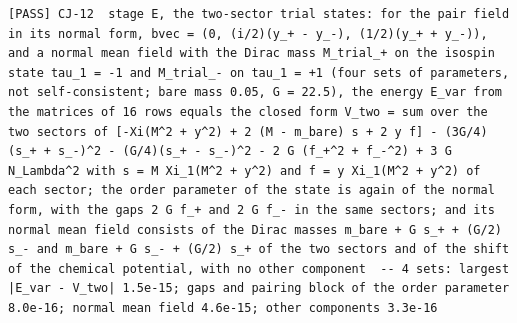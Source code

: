\documentclass[
  10pt,
]{article}
\begin{document}
\begin{verbatim}
[PASS] CJ-12  stage E, the two-sector trial states: for the pair field in its normal form, bvec = (0, (i/2)(y_+ - y_-), (1/2)(y_+ + y_-)), and a normal mean field with the Dirac mass M_trial_+ on the isospin state tau_1 = -1 and M_trial_- on tau_1 = +1 (four sets of parameters, not self-consistent; bare mass 0.05, G = 22.5), the energy E_var from the matrices of 16 rows equals the closed form V_two = sum over the two sectors of [-Xi(M^2 + y^2) + 2 (M - m_bare) s + 2 y f] - (3G/4)(s_+ + s_-)^2 - (G/4)(s_+ - s_-)^2 - 2 G (f_+^2 + f_-^2) + 3 G N_Lambda^2 with s = M Xi_1(M^2 + y^2) and f = y Xi_1(M^2 + y^2) of each sector; the order parameter of the state is again of the normal form, with the gaps 2 G f_+ and 2 G f_- in the same sectors; and its normal mean field consists of the Dirac masses m_bare + G s_+ + (G/2) s_- and m_bare + G s_- + (G/2) s_+ of the two sectors and of the shift of the chemical potential, with no other component  -- 4 sets: largest |E_var - V_two| 1.5e-15; gaps and pairing block of the order parameter 8.0e-16; normal mean field 4.6e-15; other components 3.3e-16

\end{verbatim}
\end{document}
